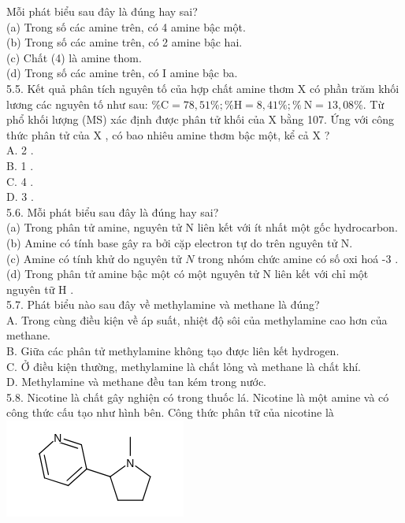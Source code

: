 \documentclass[10pt]{article}
\begin{document}
Mỗi phát biểu sau đây là đúng hay sai?\\
(a) Trong số các amine trên, có 4 amine bậc một.\\
(b) Trong số các amine trên, có 2 amine bậc hai.\\
(c) Chất (4) là amine thom.\\
(d) Trong số các amine trên, có I amine bậc ba.\\
5.5. Kết quả phân tích nguyên tố của hợp chất amine thơm X có phần trăm khối lương các nguyên tố như sau: $\% \mathrm{C}=78,51 \% ; \% \mathrm{H}=8,41 \% ; \% \mathrm{~N}=13,08 \%$. Từ phổ khối lượng (MS) xác định được phân tử khối của X bằng 107. Ứng với công thức phân tử của X , có bao nhiêu amine thơm bậc một, kể cả X ?\\
A. 2 .\\
B. 1 .\\
C. 4 .\\
D. 3 .\\
5.6. Mỗi phát biểu sau đây là đúng hay sai?\\
(a) Trong phân tử amine, nguyên tử N liên kết với ít nhất một gốc hydrocarbon.\\
(b) Amine có tính base gây ra bởi cặp electron tự do trên nguyên tử N.\\
(c) Amine có tính khử do nguyên tử $N$ trong nhóm chức amine có số oxi hoá -3 .\\
(d) Trong phân tử amine bậc một có một nguyên tử N liên kết với chỉ một nguyên tữ H .\\
5.7. Phát biểu nào sau đây về methylamine và methane là đúng?\\
A. Trong cùng điều kiện về áp suất, nhiệt độ sôi của methylamine cao hơn của methane.\\
B. Giữa các phân tử methylamine không tạo được liên kết hydrogen.\\
C. Ở điều kiện thường, methylamine là chất lỏng và methane là chất khí.\\
D. Methylamine và methane đều tan kém trong nước.\\
5.8. Nicotine là chất gây nghiện có trong thuốc lá. Nicotine là một amine và có công thức cấu tạo như hình bên. Công thức phân tữ của nicotine là\\
\includegraphics{smile-2dde04ad7f425d003d72e9ba212ddfcd82fa843e}\\
\end{document}
